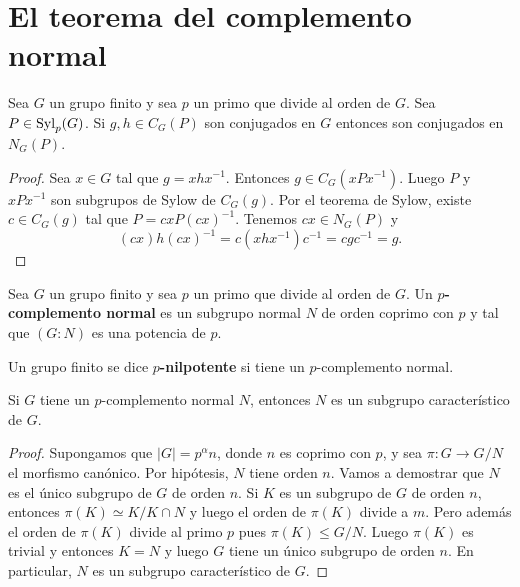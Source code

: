 \chapter{El teorema del complemento normal}

\begin{lemma}
	\label{lemma:normal_complement}
	Sea $G$ un grupo finito y sea $p$ un primo que divide al orden de $G$. Sea
	$P\in\mathrm{Syl}_p(G)$. Si $g,h\in C_G(P)$ son conjugados en $G$ entonces son
	conjugados en $N_G(P)$.
\end{lemma}

\begin{proof}
	Sea $x\in G$ tal que $g=xhx^{-1}$. Entonces $g\in C_G(xPx^{-1})$. Luego $P$
	y $xPx^{-1}$ son subgrupos de Sylow de $C_G(g)$. Por el teorema de Sylow,
	existe $c\in C_G(g)$ tal que $P=cxP(cx)^{-1}$. Tenemos $cx\in N_G(P)$ y 
	\[
	(cx)h(cx)^{-1}=c(xhx^{-1})c^{-1}=cgc^{-1}=g.
	\]
\end{proof}

\begin{definition}
	Sea $G$ un grupo finito y sea $p$ un primo que divide al orden de $G$. Un
	\textbf{$p$-complemento normal} es un subgrupo normal $N$ de orden coprimo
	con $p$ y tal que $(G:N)$ es una potencia de $p$.
\end{definition}

\begin{definition}
	Un grupo finito se dice \textbf{$p$-nilpotente} si tiene un $p$-complemento
	normal. 
\end{definition}

\begin{proposition}
	Si $G$ tiene un $p$-complemento normal $N$, entonces $N$ es un subgrupo
	característico de $G$.
\end{proposition}

\begin{proof}
	Supongamos que $|G|=p^\alpha n$, donde $n$ es coprimo con $p$, y sea
	$\pi\colon G\to G/N$ el morfismo canónico.  Por hipótesis, $N$ tiene orden
	$n$. Vamos a demostrar que $N$ es el único subgrupo de $G$ de orden $n$. Si
	$K$ es un subgrupo de $G$ de orden $n$, entonces  $\pi(K)\simeq K/K\cap N$
	y luego el orden de $\pi(K)$ divide a $m$. Pero además el orden de $\pi(K)$
	divide al primo $p$ pues $\pi(K)\leq G/N$. Luego $\pi(K)$ es trivial y
	entonces $K=N$ y luego $G$ tiene un único subgrupo de orden $n$. En
	particular, $N$ es un subgrupo característico de $G$.
\end{proof}



